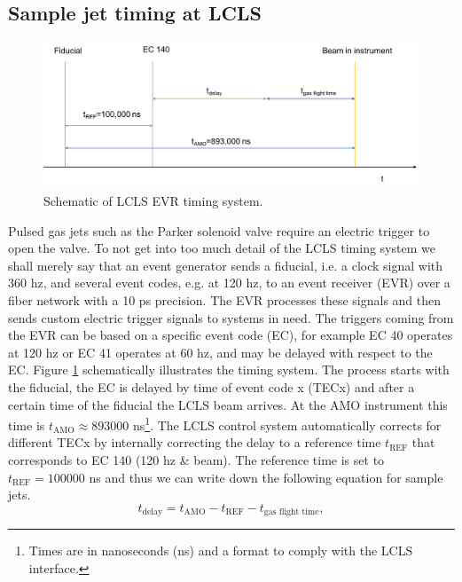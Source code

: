\subsection{Sample jet timing at LCLS}\label{sec:jet-timing}
\begin{figure}
	\centering
		\includegraphics[width=1.00\textwidth]{images/LCLS-timing-schematic.png}
	\caption{Schematic of LCLS EVR timing system.}
	\label{fig:LCLS-EVR-timing}
\end{figure}
Pulsed gas jets such as the Parker solenoid valve require an electric trigger to open the valve. To not get into too much detail of the LCLS timing system we shall merely say that an event generator sends a fiducial, i.e. a clock signal with 360 hz, and several event codes, e.g. at 120 hz, to an event receiver (EVR) over a fiber network \citep{Krejcik-2007-DIPAC} with a 10 ps precision. The EVR processes these signals and then sends custom electric trigger signals to systems in need. The triggers coming from the EVR can be based on a specific event code (EC), for example EC 40 operates at 120 hz or EC 41 operates at 60 hz, and may be delayed with respect to the EC. Figure \ref{fig:LCLS-EVR-timing} schematically illustrates the timing system. The process starts with the fiducial, the EC is delayed by time of event code x (TECx) and after a certain time of the fiducial the LCLS beam arrives. At the AMO instrument this time is $t_{\text{AMO}}\approx 893000$ ns\footnote{Times are in nanoseconds (ns) and a format to comply with the LCLS interface.}. The LCLS control system automatically corrects for different TECx by internally correcting the delay to a reference time $t_{\text{REF}}$ that corresponds to EC 140 (120 hz \& beam). The reference time is set to $t_{\text{REF}}=100000$ ns and thus we can write down the following equation for sample jets.
\begin{equation}
t_{\text{delay}} = t_{\text{AMO}} - t_{\text{REF}} - t_{\text{gas flight time}},
\label{eqn:sample-jet-delay-time}
\end{equation}
